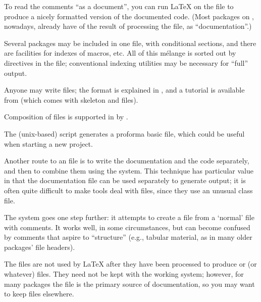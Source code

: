 To read the comments ``as a document'', you can run \LaTeX{} on the
 file to produce a nicely formatted version of the
documented code.  (Most \latex{} packages on \ctan{}, nowadays, already
have  of the result of processing the  file,
as ``documentation''.)

Several packages may be included in one  file, with
conditional sections, and there are facilities for indexes of macros,
etc.  All of this m\'elange is sorted out by directives in the
 file; conventional indexing utilities may be necessary
for ``full'' output.

Anyone may write  files; the format is explained in
, and a tutorial is available
from  (which comes with skeleton  and
 files).

Composition of  files is supported in  by
.

The (unix-based) script  generates a proforma basic
 file, which could be useful when starting a new
project.

Another route to an  file is to write the
documentation and the code separately, and then to combine them using
the  system.  This technique has particular value in
that the documentation file can be used separately to generate
 output; it is often quite difficult to make %
 tools deal
with  files, since they use an unusual class file.

The  system goes one step further: it attempts to
create a  file from a `normal'  file
with comments.  It works well, in some circumstances, but can become
confused by comments that aspire to ``structure'' (e.g., tabular
material, as in many older packages' file headers).

The  files are not used by \LaTeX{} after they have been
processed to produce  or  (or whatever)
files.  They need not be kept with the working system; however, for
many packages the  file is the primary source of
documentation, so you may want to keep  files elsewhere.

